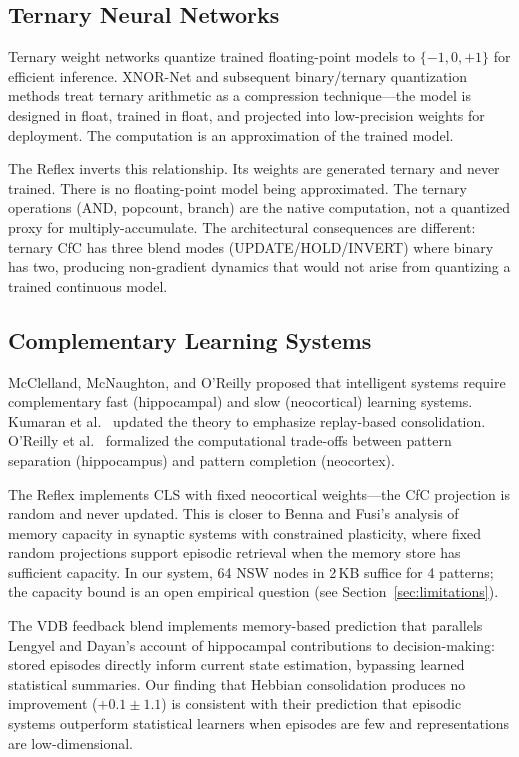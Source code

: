 \documentclass[11pt,letterpaper]{article}
\begin{document}
\subsection{Ternary Neural Networks}

Ternary weight networks \cite{li2016ternary,zhu2016trained} quantize trained floating-point models to $\{-1, 0, +1\}$ for efficient inference. XNOR-Net \cite{rastegari2016xnor} and subsequent binary/ternary quantization methods \cite{zhang2018lqnets} treat ternary arithmetic as a compression technique---the model is designed in float, trained in float, and projected into low-precision weights for deployment. The computation is an approximation of the trained model.

The Reflex inverts this relationship. Its weights are generated ternary and never trained. There is no floating-point model being approximated. The ternary operations (AND, popcount, branch) are the native computation, not a quantized proxy for multiply-accumulate. The architectural consequences are different: ternary CfC has three blend modes (UPDATE/HOLD/INVERT) where binary has two, producing non-gradient dynamics that would not arise from quantizing a trained continuous model.

\subsection{Complementary Learning Systems}

McClelland, McNaughton, and O'Reilly \cite{mcclelland1995} proposed that intelligent systems require complementary fast (hippocampal) and slow (neocortical) learning systems. Kumaran et al.\ \cite{kumaran2016} updated the theory to emphasize replay-based consolidation. O'Reilly et al.\ \cite{oreilly2014} formalized the computational trade-offs between pattern separation (hippocampus) and pattern completion (neocortex).

The Reflex implements CLS with fixed neocortical weights---the CfC projection is random and never updated. This is closer to Benna and Fusi's \cite{benna2016} analysis of memory capacity in synaptic systems with constrained plasticity, where fixed random projections support episodic retrieval when the memory store has sufficient capacity. In our system, 64 NSW nodes in 2\,KB suffice for 4 patterns; the capacity bound is an open empirical question (see Section~\ref{sec:limitations}).

The VDB feedback blend implements memory-based prediction that parallels Lengyel and Dayan's \cite{lengyel2007} account of hippocampal contributions to decision-making: stored episodes directly inform current state estimation, bypassing learned statistical summaries. Our finding that Hebbian consolidation produces no improvement ($+0.1 \pm 1.1$) is consistent with their prediction that episodic systems outperform statistical learners when episodes are few and representations are low-dimensional.
\end{document}
